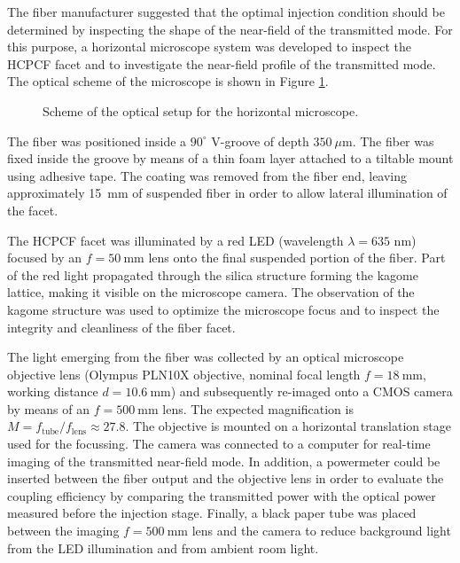 The fiber manufacturer suggested that the optimal injection condition  should be determined by inspecting the shape of the near-field of the transmitted mode. For this purpose, a horizontal microscope system was developed to inspect the HCPCF facet and to investigate the near-field profile of the transmitted mode. The optical scheme of the microscope is shown in Figure \ref{fig:horizontal_microscope}.

\begin{figure}[t]
    \centering
    
    \caption{Scheme of the optical setup for the horizontal microscope.}
    \label{fig:horizontal_microscope}
\end{figure}

The fiber was positioned inside a $90^\circ$ V-groove of depth $350~\mu\mathrm{m}$. The fiber was fixed inside the groove by means of a thin foam layer attached to a tiltable mount using adhesive tape. The coating was removed from the fiber end, leaving approximately 15~mm of suspended fiber in order to allow lateral illumination of the facet.

The HCPCF facet was illuminated by a red LED (wavelength $\lambda = 635$ nm) focused by an $f = 50~\mathrm{mm}$ lens onto the final suspended portion of the fiber. Part of the red light propagated through the silica structure forming the kagome lattice, making it visible on the microscope camera. The observation of the kagome structure was used to optimize the microscope focus and to inspect the integrity and cleanliness of the fiber facet.

The light emerging from the fiber was collected by an optical microscope objective lens (Olympus PLN10X objective, nominal focal length $f = 18~\mathrm{mm}$, working distance $d = 10.6~\mathrm{mm}$) and subsequently re-imaged onto a CMOS camera by means of an $f = 500~\mathrm{mm}$ lens. The expected magnification is $M=f_\text{tube}/f_\text{lens}\approx27.8$. The objective is mounted on a horizontal translation stage used for the focussing. The camera was connected to a computer for real-time imaging of the transmitted near-field mode. In addition, a powermeter could be inserted between the fiber output and the objective lens in order to evaluate the coupling efficiency by comparing the transmitted power with the optical power measured before the injection stage. Finally, a black paper tube was placed between the imaging $f = 500~\mathrm{mm}$ lens and the camera to reduce background light from the LED illumination and from ambient room light. 

